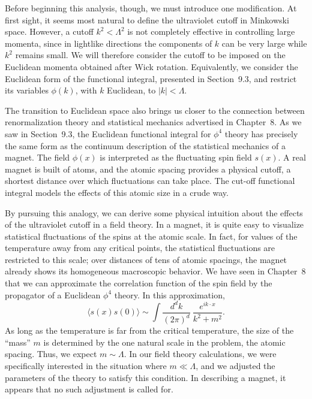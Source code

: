 Before beginning this analysis, though, we must introduce one modification.
At first sight, it seems most natural to define the ultraviolet cutoff in
Minkowski space.  However, a cutoff $k^2 < \Lambda^2$ is not completely
effective in controlling large momenta, since in lightlike directions the
components of $k$ can be very large while $k^2$ remains small.  We will
therefore consider the cutoff to be imposed on the Euclidean momenta obtained
after Wick rotation.  Equivalently, we consider the Euclidean form of the
functional integral, presented in Section~9.3, and restrict its variables
$\phi(k)$, with $k$ Euclidean, to $|k| < \Lambda$.

The transition to Euclidean space also brings us closer to the connection
between renormalization theory and statistical mechanics advertised in
Chapter~8.  As we saw in Section~9.3, the Euclidean functional integral for
$\phi^4$ theory has precisely the same form as the continuum description of
the statistical mechanics of a magnet.  The field $\phi(x)$ is interpreted as
the fluctuating spin field $s(x)$.  A real magnet is built of atoms, and the
atomic spacing provides a physical cutoff, a shortest distance over which
fluctuations can take place.  The cut-off functional integral models the
effects of this atomic size in a crude way.

By pursuing this analogy, we can derive some physical intuition about the
effects of the ultraviolet cutoff in a field theory.  In a magnet, it is quite
easy to visualize statistical fluctuations of the spins at the atomic scale.
In fact, for values of the temperature away from any critical points, the
statistical fluctuations are restricted to this scale; over distances of tens
of atomic spacings, the magnet already shows its homogeneous macroscopic
behavior.  We have seen in Chapter~8 that we can approximate the correlation
function of the spin field by the propagator of a Euclidean $\phi^4$ theory.
In this approximation,
\begin{equation}
  \langle s(x)s(0)\rangle \sim \int \frac{d^dk}{(2\pi)^d}\
    \frac{e^{ik\cdot x}}{k^2+m^2} .
  \label{eq:12.2}
\end{equation}
As long as the temperature is far from the critical temperature, the size of
the ``mass'' $m$ is determined by the one natural scale in the problem, the
atomic spacing.  Thus, we expect $m \sim \Lambda$.  In our field theory
calculations, we were specifically interested in the situation where
$m \ll \Lambda$, and we adjusted the parameters of the theory to satisfy this
condition.  In describing a magnet, it appears that no such adjustment is
called for.

